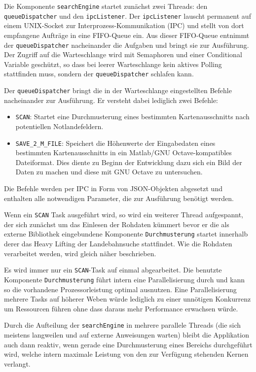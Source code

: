 \documentclass[10pt,a4paper]{report}
\begin{document}
Die Komponente \texttt{searchEngine} startet zunächst zwei Threads: den \verb|queueDispatcher| und den \verb|ipcListener|. Der  \verb|ipcListener| lauscht permanent auf einem UNIX-Socket zur Interprozess-Kommunikation (IPC) und stellt von dort empfangene Aufträge in eine FIFO-Queue ein. Aus dieser FIFO-Queue entnimmt der \verb|queueDispatcher| nacheinander die Aufgaben und bringt sie zur Ausführung. Der Zugriff auf die Warteschlange wird mit Semaphoren und einer Conditional Variable geschützt, so dass bei leerer Warteschlange kein aktives Polling stattfinden muss, sondern der \verb|queueDispatcher| schlafen kann.

Der \verb|queueDispatcher| bringt die in der Warteschlange eingestellten Befehle nacheinander zur Ausführung. Er versteht dabei lediglich zwei Befehle: 
\begin{itemize}
	\item \verb|SCAN|: Startet eine Durchmusterung eines bestimmten Kartenausschnitts nach potentiellen Notlandefeldern.
	\item \verb|SAVE_2_M_FILE|: Speichert die Höhenwerte der Eingabedaten eines bestimmten Kartenausschnitts in ein Matlab/GNU Octave-kompatibles Dateiformat. Dies diente zu Beginn der Entwicklung dazu sich ein Bild der Daten zu machen und diese mit GNU Octave zu untersuchen.
\end{itemize}
Die Befehle werden per IPC in Form von JSON-Objekten abgesetzt und enthalten alle notwendigen Parameter, die zur Ausführung benötigt werden.

Wenn ein \verb|SCAN| Task ausgeführt wird, so wird ein weiterer Thread aufgespannt, der sich zunächst um das Einlesen der Rohdaten kümmert bevor er die als externe Bibliothek eingebundene Komponente \texttt{Durchmusterung} startet innerhalb derer das Heavy Lifting der Landebahnsuche stattfindet. Wie die Rohdaten verarbeitet werden, wird gleich näher beschrieben.

Es wird immer nur ein \verb|SCAN|-Task auf einmal abgearbeitet. Die benutzte Komponente \texttt{Durchmusterung} führt intern eine Parallelisierung durch und kann so die vorhandene Prozessorleistung optimal ausnutzen. Eine Parallelisierung mehrere Tasks auf höherer Weben würde lediglich zu einer unnötigen Konkurrenz um Ressourcen führen ohne dass daraus mehr Performance erwachsen würde.

Durch die Aufteilung der \texttt{searchEngine} in mehrere parallele Threads (die sich meistens langweilen und auf externe Anweisungen warten) bleibt die Applikation auch dann reaktiv, wenn gerade eine Durchmusterung eines Bereichs durchgeführt wird, welche intern maximale Leistung von den zur Verfügung stehenden Kernen verlangt.
\end{document}
